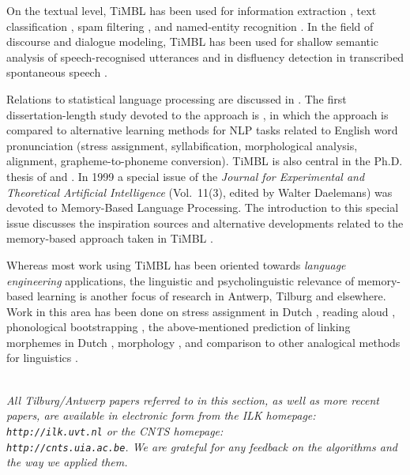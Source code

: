 \documentclass{report}
\begin{document}
On the textual level, TiMBL has been used for information extraction
\cite{Zavrel+00b,Zavrel+03}, text classification \cite{Spitters00},
spam filtering \cite{Androutsopoulos+00}, and named-entity recognition
\cite{Buchholz+00,Hendrickx+03,DeMeulder+03}. In the field of
discourse and dialogue modeling, TiMBL has been used for shallow
semantic analysis of speech-recognised utterances
\cite{Gustafson+99,Krahmer+01,VandenBosch+01,Lendvai+02a,Lendvai+03}
and in disfluency detection in transcribed spontaneous speech
\cite{Lendvai+03c}.

Relations to statistical language processing are discussed in
\cite{Zavrel+97}. The first dissertation-length study devoted to the
approach is \cite{VandenBosch97}, in which the approach is compared to
alternative learning methods for NLP tasks related to English word
pronunciation (stress assignment, syllabification, morphological
analysis, alignment, grapheme-to-phoneme conversion). TiMBL is also
central in the Ph.D. thesis of  and
. In 1999 a special issue of the {\em Journal for
  Experimental and Theoretical Artificial Intelligence} (Vol.~11(3),
edited by Walter Daelemans) was devoted to Memory-Based Language
Processing. The introduction to this special issue discusses the
inspiration sources and alternative developments related to the
memory-based approach taken in TiMBL \cite{Daelemans99b}.

Whereas most work using TiMBL has been oriented towards {\em language
engineering}\/ applications, the linguistic and psycholinguistic
relevance of memory-based learning is another focus of research in
Antwerp, Tilburg and elsewhere. Work in this area has been done on
stress assignment in Dutch \cite{Daelemans+94,Gillis+00}, reading
aloud \cite{VandenBosch+00b}, phonological bootstrapping
\cite{Durieux+00}, the above-mentioned prediction of linking morphemes
in Dutch \cite{Krott+01}, morphology \cite{Eddington00,Eddington03}, and
comparison to other analogical methods for linguistics
\cite{Daelemans+97f}.

\ \\

{\it All Tilburg/Antwerp papers referred to in this section, as well
as more recent papers, are available in electronic form from the {\sc
ILK} homepage: {\tt http://ilk.uvt.nl} or the {\sc CNTS} homepage: \\
{\tt http://cnts.uia.ac.be}. We are grateful for any feedback on the
algorithms and the way we applied them.}
\end{document}
